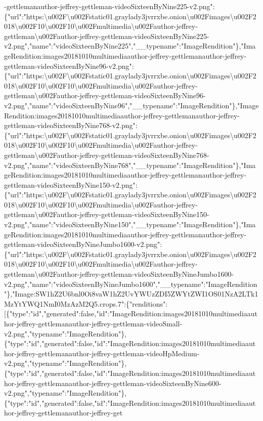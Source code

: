 -gettlemanauthor-jeffrey-gettleman-videoSixteenByNine225-v2.png":\{"url":"https:\textbackslash{}u002F\textbackslash{}u002Fstatic01.graylady3jvrrxbe.onion\textbackslash{}u002Fimages\textbackslash{}u002F2018\textbackslash{}u002F10\textbackslash{}u002F10\textbackslash{}u002Fmultimedia\textbackslash{}u002Fauthor-jeffrey-gettleman\textbackslash{}u002Fauthor-jeffrey-gettleman-videoSixteenByNine225-v2.png","name":"videoSixteenByNine225","\_\_typename":"ImageRendition"\},"ImageRendition:images20181010multimediaauthor-jeffrey-gettlemanauthor-jeffrey-gettleman-videoSixteenByNine96-v2.png":\{"url":"https:\textbackslash{}u002F\textbackslash{}u002Fstatic01.graylady3jvrrxbe.onion\textbackslash{}u002Fimages\textbackslash{}u002F2018\textbackslash{}u002F10\textbackslash{}u002F10\textbackslash{}u002Fmultimedia\textbackslash{}u002Fauthor-jeffrey-gettleman\textbackslash{}u002Fauthor-jeffrey-gettleman-videoSixteenByNine96-v2.png","name":"videoSixteenByNine96","\_\_typename":"ImageRendition"\},"ImageRendition:images20181010multimediaauthor-jeffrey-gettlemanauthor-jeffrey-gettleman-videoSixteenByNine768-v2.png":\{"url":"https:\textbackslash{}u002F\textbackslash{}u002Fstatic01.graylady3jvrrxbe.onion\textbackslash{}u002Fimages\textbackslash{}u002F2018\textbackslash{}u002F10\textbackslash{}u002F10\textbackslash{}u002Fmultimedia\textbackslash{}u002Fauthor-jeffrey-gettleman\textbackslash{}u002Fauthor-jeffrey-gettleman-videoSixteenByNine768-v2.png","name":"videoSixteenByNine768","\_\_typename":"ImageRendition"\},"ImageRendition:images20181010multimediaauthor-jeffrey-gettlemanauthor-jeffrey-gettleman-videoSixteenByNine150-v2.png":\{"url":"https:\textbackslash{}u002F\textbackslash{}u002Fstatic01.graylady3jvrrxbe.onion\textbackslash{}u002Fimages\textbackslash{}u002F2018\textbackslash{}u002F10\textbackslash{}u002F10\textbackslash{}u002Fmultimedia\textbackslash{}u002Fauthor-jeffrey-gettleman\textbackslash{}u002Fauthor-jeffrey-gettleman-videoSixteenByNine150-v2.png","name":"videoSixteenByNine150","\_\_typename":"ImageRendition"\},"ImageRendition:images20181010multimediaauthor-jeffrey-gettlemanauthor-jeffrey-gettleman-videoSixteenByNineJumbo1600-v2.png":\{"url":"https:\textbackslash{}u002F\textbackslash{}u002Fstatic01.graylady3jvrrxbe.onion\textbackslash{}u002Fimages\textbackslash{}u002F2018\textbackslash{}u002F10\textbackslash{}u002F10\textbackslash{}u002Fmultimedia\textbackslash{}u002Fauthor-jeffrey-gettleman\textbackslash{}u002Fauthor-jeffrey-gettleman-videoSixteenByNineJumbo1600-v2.png","name":"videoSixteenByNineJumbo1600","\_\_typename":"ImageRendition"\},"Image:SW1hZ2U6bnl0Oi8vaW1hZ2UvYWUzZDI5ZWYtZWI1OS01NzA2LTk1MzYtYWQ1NmI0MzAzM2Q5.crops.7":\{"renditions":{[}\{"type":"id","generated":false,"id":"ImageRendition:images20181010multimediaauthor-jeffrey-gettlemanauthor-jeffrey-gettleman-videoSmall-v2.png","typename":"ImageRendition"\},\{"type":"id","generated":false,"id":"ImageRendition:images20181010multimediaauthor-jeffrey-gettlemanauthor-jeffrey-gettleman-videoHpMedium-v2.png","typename":"ImageRendition"\},\{"type":"id","generated":false,"id":"ImageRendition:images20181010multimediaauthor-jeffrey-gettlemanauthor-jeffrey-gettleman-videoSixteenByNine600-v2.png","typename":"ImageRendition"\},\{"type":"id","generated":false,"id":"ImageRendition:images20181010multimediaauthor-jeffrey-gettlemanauthor-jeffrey-get